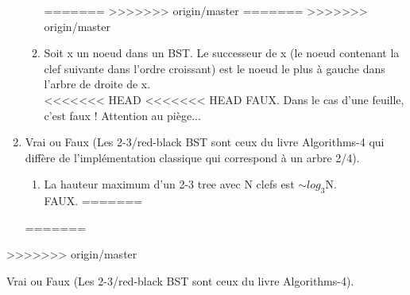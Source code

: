\documentclass[11pt]{article}
\begin{document}
\begin{enumerate}
\begin{enumerate}
=======
>>>>>>> origin/master
=======
>>>>>>> origin/master
\item Soit x un noeud dans un BST. Le successeur de x (le noeud contenant la clef
suivante dans l’ordre croissant) est le noeud le plus à gauche dans l’arbre de
droite de x.\\

<<<<<<< HEAD
<<<<<<< HEAD
{\color{dkgreen}FAUX.} Dans le cas d'une feuille, c'est faux ! Attention au piège... 
\end{enumerate}

\item Vrai ou Faux (Les 2-3/red-black BST sont ceux du livre Algorithms-4 qui diffère de l'implémentation classique qui correspond à un arbre 2/4).
\begin{enumerate}
\item La hauteur maximum d'un 2-3 tree avec N clefs est $\sim log_3$N.\\

{\color{dkgreen}FAUX.}
=======
\end{enumerate}
=======
\end{enumerate}
>>>>>>> origin/master
\item Vrai ou Faux (Les 2-3/red-black BST sont ceux du livre Algorithms-4).
\end{document}
